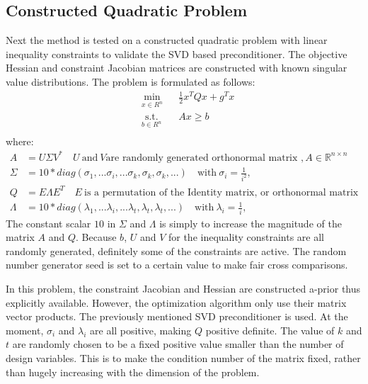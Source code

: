 \documentclass{article}
\theoremstyle{definition}
\begin{document}
\subsection{Constructed Quadratic Problem}
Next the method is tested on a constructed quadratic problem with linear inequality constraints to validate the SVD based preconditioner. The objective Hessian and constraint Jacobian matrices are constructed with known singular value distributions. The problem is formulated as follows:
\begin{equation*}
\begin{aligned}
&\underset{x \in R^n} {\text{min}}  
& & \frac{1}{2}x^T Q x + g^T x \\
&\underset{b \in R^n} {\text{s.t.}}  & & Ax \geq b  \\
\end{aligned}
\end{equation*}
where: 
\begin{equation*}
\begin{aligned}
A &= U \Sigma V^\ast  \quad U \ \text{and} \ V \textrm{are randomly generated orthonormal matrix }, A \in \mathbb{R}^{n\times n} \\ 
\Sigma &= 10*diag(\sigma_1, ... \sigma_i, ... \sigma_k, \sigma_k, \sigma_k, ... ) \quad \textrm{with} \ \sigma_i = \frac{1}{i^2},\\
Q &= E\Lambda E^T  \quad  E \ \textrm{is a permutation of the Identity matrix, or orthonormal matrix} \\
\Lambda &= 10*diag(\lambda_1, ...\lambda_i, ...\lambda_t, \lambda_t, \lambda_t, ...) \quad \textrm{with} \ \lambda_i = \frac{1}{i}, 
\end{aligned}
\end{equation*}
The constant scalar $10$ in $\Sigma$ and $\Lambda$ is simply to increase the magnitude of the matrix $A$ and $Q$.  
Because $b$, $U$ and $V$ for the inequality constraints are all randomly generated, definitely some of the constraints are active. The random number generator seed is set to a certain value to make fair cross comparisons. 

In this problem, the constraint Jacobian and Hessian are constructed a-prior thus explicitly available. However, the optimization algorithm only use their matrix vector products. The previously mentioned SVD preconditioner is used. At the moment, $\sigma_i$ and $\lambda_i$ are all positive, making $Q$ positive definite. The value of $k$ and $t$ are randomly chosen to be a fixed positive value smaller than the number of design variables. This is to make the condition number of the matrix fixed, rather than hugely increasing with the dimension of the problem. 
\end{document}
